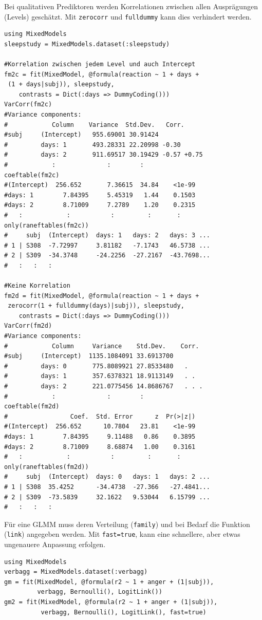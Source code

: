 \documentclass[10pt,twocolumn]{scrartcl}
\begin{document}
Bei qualitativen Prediktoren werden Korrelationen zwischen allen Ausprägungen (Levels) geschätzt. Mit \lstinline|zerocorr| und \lstinline|fulldummy| kann dies verhindert werden.

\begin{lstlisting}
using MixedModels
sleepstudy = MixedModels.dataset(:sleepstudy)

#Korrelation zwischen jedem Level und auch Intercept
fm2c = fit(MixedModel, @formula(reaction ~ 1 + days +
 (1 + days|subj)), sleepstudy,
    contrasts = Dict(:days => DummyCoding()))
VarCorr(fm2c)
#Variance components:
#            Column    Variance  Std.Dev.   Corr.
#subj     (Intercept)   955.69001 30.91424
#         days: 1       493.28331 22.20998 -0.30
#         days: 2       911.69517 30.19429 -0.57 +0.75
#            :              :        :
coeftable(fm2c)
#(Intercept)  256.652       7.36615  34.84    <1e-99
#days: 1        7.84395     5.45319   1.44    0.1503
#days: 2        8.71009     7.2789    1.20    0.2315
#   :            :           :         :       :
only(raneftables(fm2c))
#     subj  (Intercept)  days: 1   days: 2   days: 3 ...
# 1 | S308  -7.72997     3.81182   -7.1743   46.5738 ...
# 2 | S309  -34.3748     -24.2256  -27.2167  -43.7698...
#   :   :   :

#Keine Korrelation
fm2d = fit(MixedModel, @formula(reaction ~ 1 + days +
 zerocorr(1 + fulldummy(days)|subj)), sleepstudy,
    contrasts = Dict(:days => DummyCoding()))
VarCorr(fm2d)
#Variance components:
#            Column     Variance    Std.Dev.    Corr.
#subj     (Intercept)  1135.1084091 33.6913700
#         days: 0       775.8089921 27.8533480   .
#         days: 1       357.6378321 18.9113149   . .
#         days: 2       221.0775456 14.8686767   . . .
#            :              :        :
coeftable(fm2d)
#                 Coef.  Std. Error      z  Pr(>|z|)
#(Intercept)  256.652      10.7804   23.81    <1e-99
#days: 1        7.84395     9.11488   0.86    0.3895
#days: 2        8.71009     8.68874   1.00    0.3161
#   :            :           :         :       :
only(raneftables(fm2d))
#     subj  (Intercept)  days: 0   days: 1   days: 2 ...
# 1 | S308  35.4252      -34.4738  -27.366   -27.4841...
# 2 | S309  -73.5839     32.1622   9.53044   6.15799 ...
#   :   :   :
\end{lstlisting}

Für eine GLMM muss deren Verteilung (\lstinline|family|) und bei Bedarf die
Funktion (\lstinline|link|) angegeben werden. Mit \lstinline|fast=true|, kann eine schnellere, aber etwas ungenauere Anpassung erfolgen.

\begin{lstlisting}
using MixedModels
verbagg = MixedModels.dataset(:verbagg)
gm = fit(MixedModel, @formula(r2 ~ 1 + anger + (1|subj)),
         verbagg, Bernoulli(), LogitLink())
gm2 = fit(MixedModel, @formula(r2 ~ 1 + anger + (1|subj)),
          verbagg, Bernoulli(), LogitLink(), fast=true)

\end{lstlisting}



\end{document}
